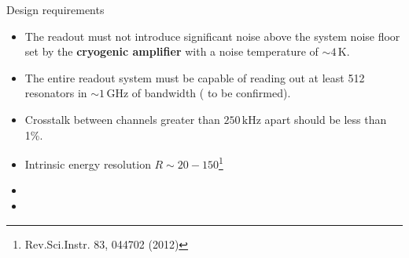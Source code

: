 \documentclass[ignorenonframetext,12pt]{beamer}
\begin{document}
\begin{frame}{Design requirements}
				\begin{itemize}
								\item The readout must not introduce significant noise above the
												system noise floor set by the \textbf{cryogenic
												amplifier}
												with a noise temperature of $\sim 4\,\text{K}$.
								\item The entire readout system must be capable of
												reading out at least 512 resonators in $\sim
												1\,\text{GHz}$ of bandwidth ({\color{red} to be
												confirmed}).
								\item Crosstalk between channels greater than $250\,\text{kHz}$
												apart should be less than 1\%.
								\item Intrinsic energy resolution $R \sim
												20-150$\footnote{Rev.Sci.Instr. 83, 044702 (2012)}
								\item 
								\item 
				\end{itemize}
\end{frame}
\end{document}
